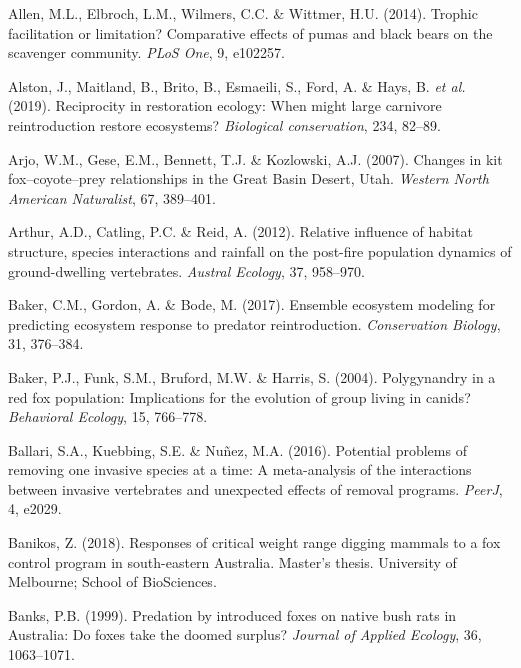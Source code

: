 \documentclass[11pt,a4paper,titlepage,twoside,openright]{style/unimelbthesis}
\begin{document}
\begin{mainmatter}
\leavevmode\hypertarget{ref-allen2014trophic}{}%
Allen, M.L., Elbroch, L.M., Wilmers, C.C. \& Wittmer, H.U. (2014). Trophic facilitation or limitation? Comparative effects of pumas and black bears on the scavenger community. \emph{PLoS One}, 9, e102257.

\leavevmode\hypertarget{ref-alston2019reciprocity}{}%
Alston, J., Maitland, B., Brito, B., Esmaeili, S., Ford, A. \& Hays, B. \emph{et al.} (2019). Reciprocity in restoration ecology: When might large carnivore reintroduction restore ecosystems? \emph{Biological conservation}, 234, 82--89.

\leavevmode\hypertarget{ref-arjo2007changes}{}%
Arjo, W.M., Gese, E.M., Bennett, T.J. \& Kozlowski, A.J. (2007). Changes in kit fox--coyote--prey relationships in the Great Basin Desert, Utah. \emph{Western North American Naturalist}, 67, 389--401.

\leavevmode\hypertarget{ref-arthur2012relative}{}%
Arthur, A.D., Catling, P.C. \& Reid, A. (2012). Relative influence of habitat structure, species interactions and rainfall on the post-fire population dynamics of ground-dwelling vertebrates. \emph{Austral Ecology}, 37, 958--970.

\leavevmode\hypertarget{ref-baker2017ensemble}{}%
Baker, C.M., Gordon, A. \& Bode, M. (2017). Ensemble ecosystem modeling for predicting ecosystem response to predator reintroduction. \emph{Conservation Biology}, 31, 376--384.

\leavevmode\hypertarget{ref-baker2004polygynandry}{}%
Baker, P.J., Funk, S.M., Bruford, M.W. \& Harris, S. (2004). Polygynandry in a red fox population: Implications for the evolution of group living in canids? \emph{Behavioral Ecology}, 15, 766--778.

\leavevmode\hypertarget{ref-ballari2016potential}{}%
Ballari, S.A., Kuebbing, S.E. \& Nuñez, M.A. (2016). Potential problems of removing one invasive species at a time: A meta-analysis of the interactions between invasive vertebrates and unexpected effects of removal programs. \emph{PeerJ}, 4, e2029.

\leavevmode\hypertarget{ref-banikos2018responses}{}%
Banikos, Z. (2018). Responses of critical weight range digging mammals to a fox control program in south-eastern Australia. Master's thesis. University of Melbourne; School of BioSciences.

\leavevmode\hypertarget{ref-banks1999predation}{}%
Banks, P.B. (1999). Predation by introduced foxes on native bush rats in Australia: Do foxes take the doomed surplus? \emph{Journal of Applied Ecology}, 36, 1063--1071.


\end{mainmatter}
\end{document}
